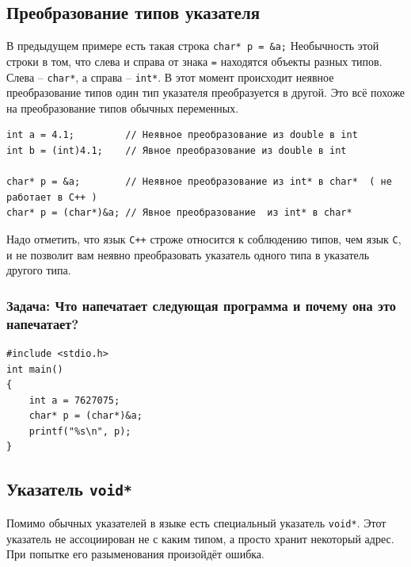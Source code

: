 \documentclass{article}
\begin{document}
\subsection*{Преобразование типов указателя}
В предыдущем примере есть такая строка \texttt{char* p = \&a;} Необычность этой строки в том, что слева и справа от знака \texttt{=} находятся объекты разных типов. Слева -- \texttt{char*}, а справа -- \texttt{int*}. В этот момент происходит неявное преобразование типов один тип указателя преобразуется в другой. Это всё похоже на преобразование типов обычных переменных.
\begin{lstlisting}
int a = 4.1;         // Неявное преобразование из double в int
int b = (int)4.1;    // Явное преобразование из double в int

char* p = &a;        // Неявное преобразование из int* в char*  ( не работает в C++ )
char* p = (char*)&a; // Явное преобразование  из int* в char*
\end{lstlisting}
Надо отметить, что язык \texttt{C++} строже относится к соблюдению типов, чем язык \texttt{C}, и не позволит вам неявно преобразовать указатель одного типа в указатель другого типа.

\subsubsection*{Задача: Что напечатает следующая программа и почему она это напечатает?}
\begin{lstlisting} 
#include <stdio.h>
int main() 
{
    int a = 7627075;
    char* p = (char*)&a;
    printf("%s\n", p);
}
\end{lstlisting}
\subsection*{Указатель \texttt{void*}}
Помимо обычных указателей в языке есть специальный указатель \texttt{void*}. Этот указатель не ассоциирован не с каким типом, а просто хранит некоторый адрес. При попытке его разыменования произойдёт ошибка.
\end{document}
